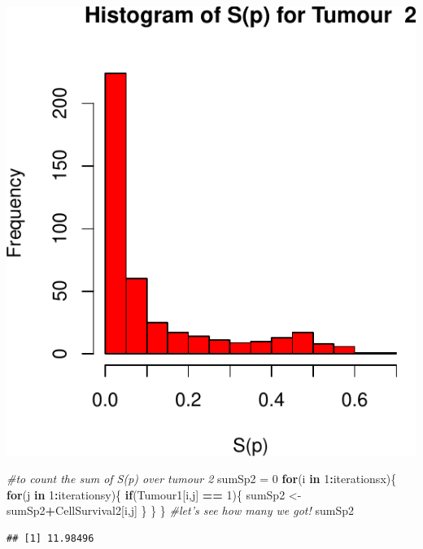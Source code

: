 \documentclass[]{article}
\newenvironment{Shaded}{\begin{snugshade}}{\end{snugshade}}
\newcommand{\DecValTok}[1]{\textcolor[rgb]{0.00,0.00,0.81}{#1}}
\newcommand{\StringTok}[1]{\textcolor[rgb]{0.31,0.60,0.02}{#1}}
\newcommand{\CommentTok}[1]{\textcolor[rgb]{0.56,0.35,0.01}{\textit{#1}}}
\newcommand{\ControlFlowTok}[1]{\textcolor[rgb]{0.13,0.29,0.53}{\textbf{#1}}}
\newcommand{\OperatorTok}[1]{\textcolor[rgb]{0.81,0.36,0.00}{\textbf{#1}}}
\newcommand{\NormalTok}[1]{#1}
\begin{document}
\begin{center}\includegraphics{TumourSurvival_files/figure-latex/unnamed-chunk-13-4} \end{center}

\begin{Shaded}
\begin{Highlighting}[]
\CommentTok{#to count the sum of S(p) over tumour 2 }
\NormalTok{sumSp2 =}\StringTok{ }\DecValTok{0}
\ControlFlowTok{for}\NormalTok{(i }\ControlFlowTok{in} \DecValTok{1}\OperatorTok{:}\NormalTok{iterationsx)\{}
  \ControlFlowTok{for}\NormalTok{(j }\ControlFlowTok{in} \DecValTok{1}\OperatorTok{:}\NormalTok{iterationsy)\{}
    \ControlFlowTok{if}\NormalTok{(Tumour1[i,j] }\OperatorTok{==}\StringTok{ }\DecValTok{1}\NormalTok{)\{}
\NormalTok{      sumSp2 <-}\StringTok{ }\NormalTok{sumSp2}\OperatorTok{+}\NormalTok{CellSurvival2[i,j]}
\NormalTok{    \}}
\NormalTok{    \}}
\NormalTok{\}}
\CommentTok{#let's see how many we got!}
\NormalTok{sumSp2}
\end{Highlighting}
\end{Shaded}

\begin{verbatim}
## [1] 11.98496
\end{verbatim}
\end{document}
